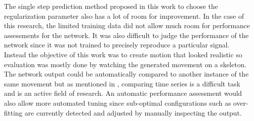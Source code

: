\documentclass[letterpaper,9pt]{article}
\begin{document}
The single step prediction method proposed in this work to choose the regularization parameter also has a lot of room for improvement. In the case of this research, the limited training data did not allow much room for performance assessments for the network. It was also difficult to judge the performance of the network since it was not trained to precisely reproduce a particular signal. Instead the objective of this work was to create motion that looked realistic so evaluation was mostly done by watching the generated movement on a skeleton. The network output could be automatically compared to another instance of the same movement but as mentioned in \cite{SimilarityMeasure}, comparing time series is a difficult task and is an active field of research. An automatic performance assessment would also allow more automated tuning since sub-optimal configurations such as over-fitting are currently detected and adjusted by manually inspecting the output.



\end{document}

